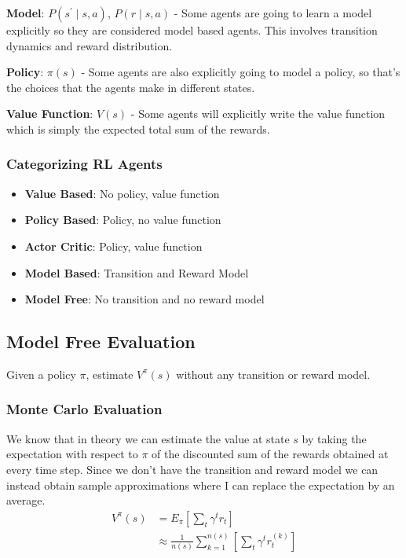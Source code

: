 \documentclass[12pt]{article}
\begin{document}
        \textbf{Model}: $P(s^{\prime} \mid s, a)$, $P(r \mid s, a)$ -
        Some agents are going to learn a model explicitly so they are considered model based agents. This involves
        transition dynamics and reward distribution.

        \textbf{Policy}: $\pi(s)$ -
        Some agents are also explicitly going to model a policy, so that's the choices that the agents make in different
        states.

        \textbf{Value Function}: $V(s)$ -
        Some agents will explicitly write the value function which is simply the expected total sum of the rewards. 

        \subsubsection{Categorizing RL Agents}
            \begin{itemize}
                \item \textbf{Value Based}: No policy, value function
                \item \textbf{Policy Based}: Policy, no value function
                \item \textbf{Actor Critic}: Policy, value function
                \item \textbf{Model Based}: Transition and Reward Model
                \item \textbf{Model Free}: No transition and no reward model
            \end{itemize}
    
    \subsection{Model Free Evaluation}
        Given a policy $\pi$, estimate $V^{\pi}(s)$ without any transition or reward model.

        \subsubsection{Monte Carlo Evaluation}
            We know that in theory we can estimate the value at state $s$ by taking the expectation with respect to $\pi$
            of the discounted sum of the rewards obtained at every time step. Since we don't have the transition and
            reward model we can instead obtain sample approximations where I can replace the expectation by an average. 
            \begin{align*}
            V^{\pi}(s) &= E_{\pi}[\sum_t \gamma^t r_t] \\
            & \approx \frac{1}{n(s)} \sum^{n(s)}_{k=1} \left[\sum_t \gamma^t r_t^{(k)}\right] 
            \end{align*}
\end{document}
